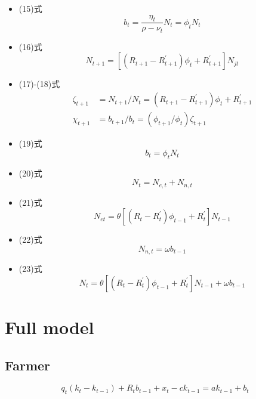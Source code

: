 \documentclass[dvipdfmx]{jlreq}
\begin{document}
\begin{itemize}
  \item (15)式
    \begin{equation}
      b_t = \frac{\eta_t}{\rho-\nu_t} N_{t} = \phi_t N_{t}
    \end{equation}

  \item (16)式
    \begin{equation}
      N_{t+1} = [(R_{t+1} - R^\prime_{t+1}) \phi_t + R^\prime_{t+1}] N_{jt}
    \end{equation}

  \item (17)-(18)式
    \begin{align}
      \zeta_{t+1} &= N_{t+1} / N_t = (R_{t+1} - R^\prime_{t+1}) \phi_t + R^\prime_{t+1} \\
      \chi_{t+1} &= b_{t+1} / b_t = (\phi_{t+1} / \phi_t) \zeta_{t+1}
    \end{align}

  \item (19)式
    \begin{equation}
      b_t = \phi_t N_t
    \end{equation}

  \item (20)式
    \begin{equation}
      N_t = N_{e, t} + N_{n, t}
    \end{equation}

  \item (21)式
    \begin{equation}
      N_{et} = \theta [(R_t - R^\prime_t) \phi_{t-1} + R^\prime_t] N_{t-1}
    \end{equation}

  \item (22)式
    \begin{equation}
      N_{n, t} = \omega b_{t-1}
    \end{equation}

  \item (23)式
    \begin{equation}
      N_t = \theta [(R_t - R^\prime_t) \phi_{t-1} + R^\prime_t] N_{t-1} + \omega b_{t-1}
    \end{equation}
\end{itemize}

\newpage

\section{Full model}
\subsection{Farmer}
\begin{equation}
q_t(k_t-k_{t-1})+R_tb_{t-1}+x_t-ck_{t-1}
=
ak_{t-1}+b_t
\end{equation}
\end{document}
